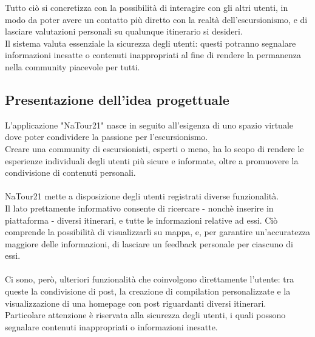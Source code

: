 \documentclass{natourDoc}
\begin{document}
Tutto ciò si concretizza con la possibilità di interagire con gli altri utenti, in modo da poter avere un contatto più diretto con
la realtà dell'escursionismo, e di lasciare valutazioni personali su qualunque itinerario si desideri.\\

Il sistema valuta essenziale la sicurezza degli utenti: questi potranno segnalare informazioni inesatte o contenuti inappropriati al fine
di rendere la permanenza nella community piacevole per tutti.

\subsection{Presentazione dell'idea progettuale}

L'applicazione "NaTour21" nasce in seguito all'esigenza di uno spazio virtuale dove poter condividere la passione per l'escursionismo.\\
Creare una community di escursionisti, esperti o meno, ha lo scopo di rendere le esperienze individuali degli utenti più sicure e informate,
oltre a promuovere la condivisione di contenuti personali.\\\\
NaTour21 mette a disposizione degli utenti registrati diverse funzionalità.\\
Il lato prettamente informativo consente di ricercare - nonchè inserire in piattaforma - diversi itinerari, e tutte le informazioni relative ad essi.
Ciò comprende la possibilità di visualizzarli su mappa, e, per garantire un'accuratezza maggiore delle informazioni, di lasciare
un feedback personale per ciascuno di essi.\\\\
Ci sono, però, ulteriori funzionalità che coinvolgono direttamente l'utente: tra queste la condivisione di post, la creazione di compilation personalizzate e
la visualizzazione di una homepage con post riguardanti diversi itinerari.\\
Particolare attenzione è riservata alla sicurezza degli utenti, i quali possono segnalare contenuti inappropriati o informazioni inesatte.
\end{document}
